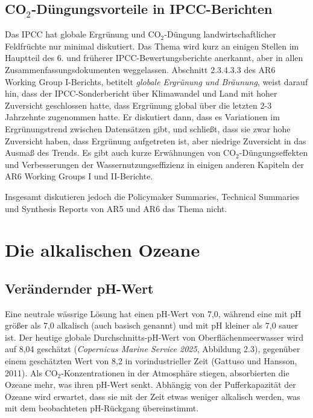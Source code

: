 \documentclass[12pt,paper=a4,DIV=12,parskip=never,chapterprefix=false,headings=standardclasses]{scrreprt}
\numberwithin{figure}{chapter}
\begin{document}
\subsection{CO$_2$-Düngungsvorteile in IPCC-Berichten}

Das IPCC hat globale Ergrünung und CO$_2$-Düngung landwirtschaftlicher Feldfrüchte nur minimal diskutiert. Das Thema wird kurz an einigen Stellen im Hauptteil des 6. und früherer IPCC-Bewertungsberichte anerkannt, aber in allen Zusammenfassungsdokumenten weggelassen. Abschnitt 2.3.4.3.3 des AR6 Working Group I-Berichts, betitelt \emph{globale Ergrünung und Bräunung}, weist darauf hin, dass der IPCC-Sonderbericht über Klimawandel und Land mit hoher Zuversicht geschlossen hatte, dass Ergrünung global über die letzten 2-3 Jahrzehnte zugenommen hatte. Er diskutiert dann, dass es Variationen im Ergrünungstrend zwischen Datensätzen gibt, und schließt, dass sie zwar hohe Zuversicht haben, dass Ergrünung aufgetreten ist, aber niedrige Zuversicht in das Ausmaß des Trends. Es gibt auch kurze Erwähnungen von CO$_2$-Düngungseffekten und Verbesserungen der Wassernutzungseffizienz in einigen anderen Kapiteln der AR6 Working Groups I und II-Berichte.

Insgesamt diskutieren jedoch die Policymaker Summaries, Technical Summaries und Synthesis Reports von AR5 und AR6 das Thema nicht.


\section{Die alkalischen Ozeane}

\subsection{Verändernder pH-Wert}

Eine neutrale wässrige Lösung hat einen pH-Wert von 7,0, während eine mit pH größer als 7,0 alkalisch (auch basisch genannt) und mit pH kleiner als 7,0 sauer ist. Der heutige globale Durchschnitts-pH-Wert von Oberflächenmeerwasser wird auf 8,04 geschätzt (\emph{Copernicus Marine Service 2025}, Abbildung 2.3), gegenüber einem geschätzten Wert von 8,2 in vorindustrieller Zeit (Gattuso und Hansson, 2011). Als CO$_2$-Konzentrationen in der Atmosphäre stiegen, absorbierten die Ozeane mehr, was ihren pH-Wert senkt. Abhängig von der Pufferkapazität der Ozeane wird erwartet, dass sie mit der Zeit etwas weniger alkalisch werden, was mit dem beobachteten pH-Rückgang übereinstimmt.
\end{document}
